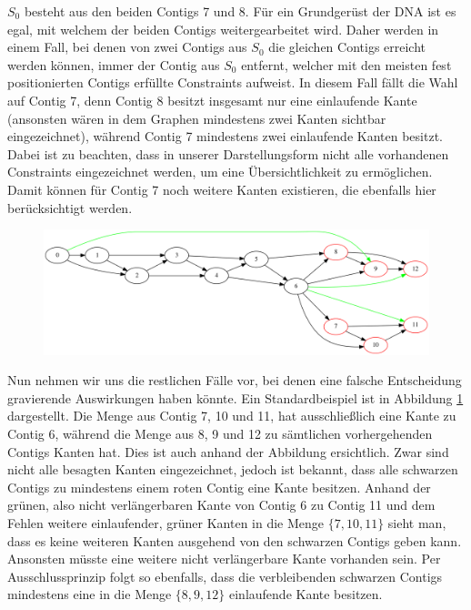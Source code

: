 $S_0$ besteht aus den beiden Contigs 7 und 8. Für ein Grundgerüst der DNA ist es egal, mit welchem der beiden Contigs weitergearbeitet wird. Daher werden in einem Fall, bei denen von zwei Contigs aus $S_0$ die gleichen Contigs erreicht werden können, immer der Contig aus $S_0$ entfernt, welcher mit den meisten fest positionierten Contigs erfüllte Constraints aufweist. 
In diesem Fall fällt die Wahl auf Contig 7, denn Contig 8 besitzt insgesamt nur eine einlaufende Kante (ansonsten wären in dem Graphen mindestens zwei Kanten sichtbar eingezeichnet), während Contig 7 mindestens zwei einlaufende Kanten besitzt. Dabei ist zu beachten, dass in unserer Darstellungsform nicht alle vorhandenen Constraints eingezeichnet werden, um eine Übersichtlichkeit zu ermöglichen. Damit können für Contig 7 noch weitere Kanten existieren, die ebenfalls hier berücksichtigt werden. 


\begin{figure}
	\begin{center}
		\includegraphics[width=1\textwidth]{bilder/bigsplit}
	\end{center}
	\label{bigsplit}
	\caption{}
\end{figure}
Nun nehmen wir uns die restlichen Fälle vor, bei denen eine falsche Entscheidung gravierende Auswirkungen haben könnte. Ein Standardbeispiel ist in Abbildung \ref{bigsplit} dargestellt. 
Die Menge aus Contig 7, 10 und 11, hat ausschließlich eine Kante zu Contig 6, während die Menge aus 8, 9 und 12 zu sämtlichen vorhergehenden Contigs Kanten hat.
Dies ist auch anhand der Abbildung ersichtlich. Zwar sind nicht alle besagten Kanten eingezeichnet, jedoch ist bekannt, dass alle schwarzen Contigs zu mindestens einem roten Contig eine Kante besitzen. Anhand der grünen, also nicht verlängerbaren Kante von Contig 6 zu Contig 11 und dem Fehlen weitere einlaufender, grüner Kanten in die Menge $\{ 7, 10, 11 \}$ sieht man, dass es keine weiteren Kanten ausgehend von den schwarzen Contigs geben kann. Ansonsten müsste eine weitere nicht verlängerbare Kante vorhanden sein.
Per Ausschlussprinzip folgt so ebenfalls, dass die verbleibenden schwarzen Contigs mindestens eine in die Menge $\{8,9,12\}$ einlaufende Kante besitzen.

